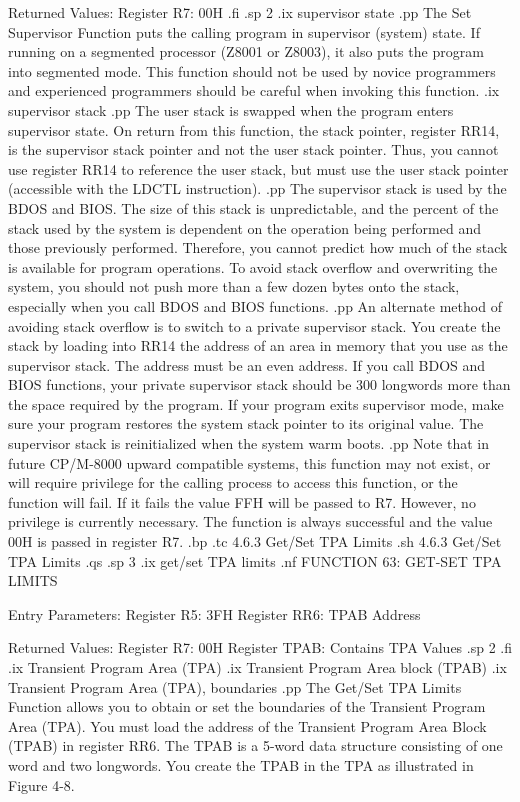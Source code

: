                      Returned  Values:
                        Register   R7:  00H
.fi
.sp 2
.ix supervisor state
.pp
The Set Supervisor Function puts the calling program in supervisor 
(system) state.  If running on a segmented processor (Z8001 or Z8003),
it also puts the program into segmented mode.
This function should not be used by novice 
programmers and experienced programmers should be careful when 
invoking this function.
.ix supervisor stack
.pp
The user stack is swapped when the program enters supervisor state.  
On return from this function, the stack pointer, register RR14, is the 
supervisor stack pointer and not the user stack pointer. Thus, you
cannot use register RR14 to reference the user stack, but must use
the user stack pointer (accessible with the LDCTL instruction).  
.pp
The supervisor stack is used by the BDOS and BIOS. The
size of this stack is unpredictable, and the percent of the stack used 
by the system is dependent on the operation being performed and 
those previously performed. Therefore, you cannot predict
how much of the stack is available for program operations.  To 
avoid stack overflow and overwriting the system, you should not  
push more than a few dozen bytes onto the stack, especially when
you call BDOS and BIOS functions. 
.pp
An alternate method of avoiding stack overflow is to switch to a private
supervisor stack. You create the stack by loading into RR14 the address of an
area in memory that you use as the supervisor stack. The address must be an
even address. If you call BDOS and BIOS functions, your private supervisor
stack should be 300 longwords more than the space required by the program.
If your program exits supervisor mode, make sure your program restores the
system stack pointer to its original value. The supervisor stack is
reinitialized when the system warm boots. 
.pp
Note that in future CP/M-8000 upward compatible systems, this
function may not exist, or will require privilege for the calling
process to access this function, or the function will fail. If it fails 
the value FFH will be passed to   R7.  However, no
privilege is currently necessary. The function is always
successful and the value 00H is passed in register   R7. 
.bp
.tc         4.6.3  Get/Set TPA Limits
.sh
4.6.3  Get/Set TPA Limits
.qs
.sp 3
.ix get/set TPA limits
.nf
                FUNCTION 63:  GET-SET TPA LIMITS

                 Entry Parameters:
                    Register   R5:  3FH
                    Register  RR6:  TPAB Address

                 Returned  Values:
                    Register   R7:  00H
                    Register TPAB:  Contains TPA
                                    Values
.sp 2
.fi
.ix Transient Program Area (TPA)
.ix Transient Program Area block (TPAB)
.ix Transient Program Area (TPA), boundaries
.pp
The Get/Set TPA Limits Function allows you to obtain or set the
boundaries of the Transient Program Area (TPA).  You must load
the address of the Transient Program Area Block (TPAB) in 
register  RR6.  The TPAB is a 5-word data structure consisting  
of one word and two longwords. You create the TPAB in 
the TPA as illustrated in Figure 4-8. 

